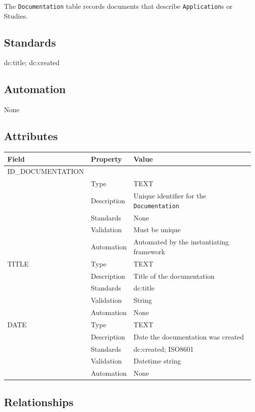 \documentclass[
]{article}
\newcounter{none} %
\begin{document}
The \texttt{Documentation} table records documents that describe
\texttt{Application}s or Studies.

\subsection{Standards}\label{standards-13}

dc:title; dc:created

\subsection{Automation}\label{automation-13}

None

\subsection{Attributes}\label{attributes-13}

{\def\LTcaptype{none} %
\begin{longtable}[]{@{}lll@{}}
\toprule\noalign{}
Field & Property & Value \\
\midrule\noalign{}
\endhead
\bottomrule\noalign{}
\endlastfoot
ID\_DOCUMENTATION & & \\
& Type & TEXT \\
& Description & Unique identifier for the \texttt{Documentation} \\
& Standards & None \\
& Validation & Must be unique \\
& Automation & Automated by the instantiating framework \\
TITLE & Type & TEXT \\
& Description & Title of the documentation \\
& Standards & dc:title \\
& Validation & String \\
& Automation & None \\
DATE & Type & TEXT \\
& Description & Date the documentation was created \\
& Standards & dc:created; ISO8601 \\
& Validation & Datetime string \\
& Automation & None \\
\end{longtable}
}

\subsection{Relationships}\label{relationships-9}
\end{document}
